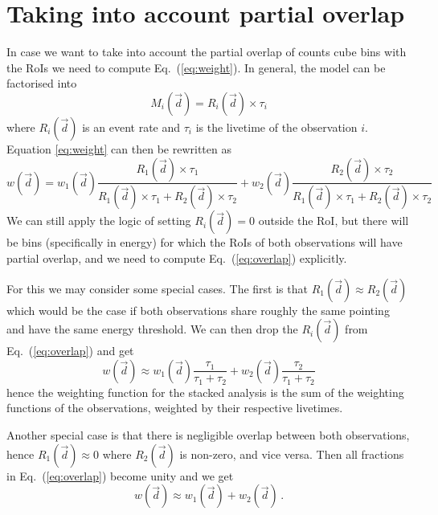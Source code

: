 \documentclass{article}[12pt,a4]
\begin{document}
\section{Taking into account partial overlap}

In case we want to take into account the partial overlap of counts cube bins with the RoIs we
need to compute Eq.~(\ref{eq:weight}).
In general, the model can be factorised into 
\begin{equation}
M_i(\vec{d}) = R_i(\vec{d}) \times \tau_i
\end{equation}
where $R_i(\vec{d})$ is an event rate and $\tau_i$ is the livetime of the observation $i$.
Equation \ref{eq:weight} can then be rewritten as
\begin{equation}
w(\vec{d}) =
w_1(\vec{d}) \frac{R_1(\vec{d}) \times \tau_1}
{R_1(\vec{d}) \times \tau_1 + R_2(\vec{d}) \times \tau_2} +
w_2(\vec{d}) \frac{R_2(\vec{d}) \times \tau_2}
{R_1(\vec{d}) \times \tau_1 + R_2(\vec{d}) \times \tau_2}
\label{eq:overlap}
\end{equation}
We can still apply the logic of setting $R_i(\vec{d}) = 0$ outside the RoI, but there will be bins
(specifically in energy) for which the RoIs of both observations will have partial overlap, and we
need to compute Eq.~(\ref{eq:overlap}) explicitly.

For this we may consider some special cases.
The first is that $R_1(\vec{d}) \approx R_2(\vec{d})$ which would be the case if both observations
share roughly the same pointing and have the same energy threshold.
We can then drop the $R_i(\vec{d})$ from Eq.~(\ref{eq:overlap}) and get
\begin{equation}
w(\vec{d}) \approx w_1(\vec{d}) \frac{\tau_1}{\tau_1 + \tau_2} + w_2(\vec{d}) \frac{\tau_2}{\tau_1 + \tau_2}
\end{equation}
hence the weighting function for the stacked analysis is the sum of the weighting functions of the
observations, weighted by their respective livetimes.

Another special case is that there is negligible overlap between both observations, hence
$R_1(\vec{d}) \approx 0$ where $R_2(\vec{d})$ is non-zero, and vice versa.
Then all fractions in Eq.~(\ref{eq:overlap}) become unity and we get
\begin{equation}
w(\vec{d}) \approx w_1(\vec{d}) + w_2(\vec{d}) \, .
\end{equation}
\end{document}
